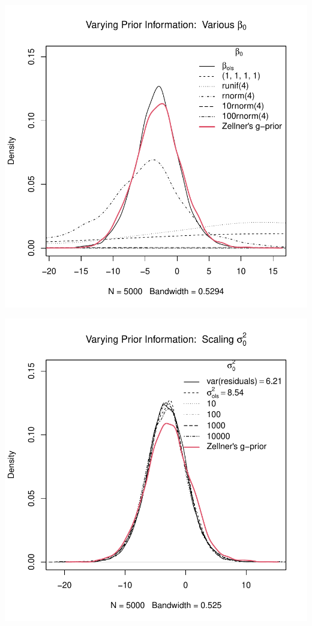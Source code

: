 \documentclass[12pt, a4paper]{article}
\begin{document}
\includegraphics{Thesis-019}

\includegraphics{Thesis-020}
\end{document}
